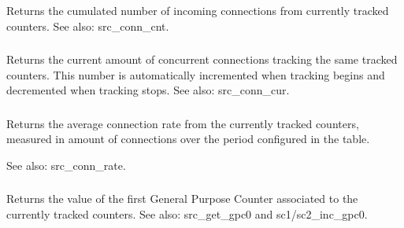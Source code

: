 \subsubsection[sc1\_conn\_cnt]{}
\subsubsection[sc2\_conn\_cnt]{}
  Returns the cumulated number of incoming connections from currently tracked
  counters.
See also: src\_conn\_cnt.

\subsubsection[sc1\_conn\_cur]{}
\subsubsection[sc2\_conn\_cur]{}
  Returns the current amount of concurrent connections tracking the same
  tracked counters. This number is automatically incremented when tracking
  begins and decremented when tracking stops.
See also: src\_conn\_cur.

\subsubsection[sc1\_conn\_rate]{}
\subsubsection[sc2\_conn\_rate]{}
  Returns the average connection rate from the currently tracked counters,
  measured in amount of connections over the period configured in the table.

See also: src\_conn\_rate.

\subsubsection[sc1\_get\_gpc0]{}
\subsubsection[sc2\_get\_gpc0]{}
  Returns the value of the first General Purpose Counter associated to the
  currently tracked counters.
See also: src\_get\_gpc0 and sc1/sc2\_inc\_gpc0.

